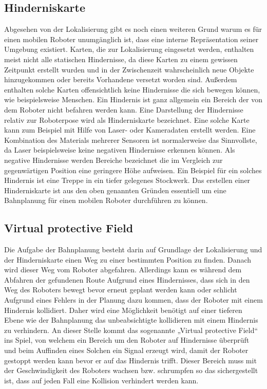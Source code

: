 \subsection{Hinderniskarte}
Abgesehen von der Lokalisierung gibt es noch einen weiteren Grund warum es für einen mobilen Roboter unumgänglich ist,
 dass eine interne Repräsentation seiner Umgebung existiert. Karten, die zur Lokalisierung eingesetzt werden,
 enthalten meist nicht alle statischen Hindernisse, da diese Karten zu einem gewissen Zeitpunkt erstellt wurden und
 in der Zwischenzeit wahrscheinlich neue Objekte hinzugekommen oder bereits Vorhandene versetzt worden sind.
 Außerdem enthalten solche Karten offensichtlich keine Hindernisse die sich bewegen können, wie beispielsweise Menschen.
 Ein Hindernis ist ganz allgemein ein Bereich der von dem Roboter nicht befahren werden kann. Eine Darstellung der Hindernisse
 relativ zur Roboterpose wird als Hinderniskarte bezeichnet. Eine solche Karte
 kann zum Beispiel mit Hilfe von Laser- oder Kameradaten erstellt werden.
 Eine Kombination des Materials mehrerer Sensoren ist normalerweise das Sinnvollste,
 da Laser beispielsweise keine negativen Hindernisse erkennen können.
 Als negative Hindernisse werden Bereiche bezeichnet die im Vergleich zur
 gegenwärtigen Position eine geringere Höhe aufweisen.
 Ein Beispiel für ein solches Hindernis ist eine Treppe in ein tiefer gelegenes
 Stockwerk. Das erstellen einer Hinderniskarte ist aus den oben genannten
 Gründen essentiell um eine Bahnplanung für einen mobilen Roboter
 durchführen zu können.
\subsection{Virtual protective Field}
Die Aufgabe der Bahnplanung besteht darin auf Grundlage der Lokalisierung und der Hinderniskarte einen Weg zu einer
 bestimmten Position zu finden. Danach wird dieser Weg vom Roboter abgefahren. Allerdings kann es während dem Abfahren der gefundenen
 Route Aufgrund eines Hindernisses, dass sich in den Weg des Roboters bewegt bevor erneut geplant werden kann oder
 schlicht Aufgrund eines Fehlers in der Planung dazu kommen, dass der Roboter mit einem Hindernis kollidiert.
 Daher wird eine Möglichkeit benötigt auf einer tieferen Ebene wie der Bahnplanung das unbeabsichtigte kollidieren mit einem Hindernis
 zu verhindern. An dieser Stelle kommt das sogenannte „Virtual protective Field“ ins Spiel, von welchem ein Bereich um den Roboter auf
 Hindernisse überprüft und beim Auffinden eines Solchen ein Signal erzeugt wird, damit der Roboter gestoppt werden kann bevor er
 auf das Hindernis trifft. Dieser Bereich muss mit der Geschwindigkeit des
 Roboters wachsen bzw. schrumpfen so das sichergestellt ist, dass auf jeden
 Fall eine Kollision verhindert werden kann.
